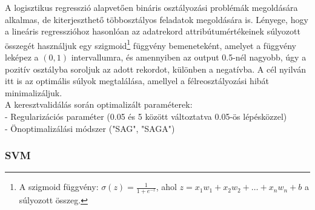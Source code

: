 \documentclass[12pt]{article}
\begin{document}
A logisztikus regresszió alapvetően bináris osztályozási problémák megoldására alkalmas, de kiterjeszthető többosztályos feladatok megoldására is. Lényege, hogy a lineáris regresszióhoz hasonlóan az adatrekord attribútumértékeinek súlyozott összegét használjuk egy szigmoid\footnote{A szigmoid függvény: $\sigma(z)=\frac{1}{1+e^{-z}}$, ahol $z=x_1w_1+x_2w_2+ \dots +x_nw_n+b$ a súlyozott összeg.} függvény bemeneteként, amelyet a függvény leképez a $\left(0,1\right)$ intervallumra, és amennyiben az output 0.5-nél nagyobb, úgy a pozitív osztályba soroljuk az adott rekordot, különben a negatívba. A cél nyilván itt is az optimális súlyok megtalálása, amellyel a félreosztályozási hibát minimalizáljuk. \\

\noindent A keresztvalidálás során optimalizált paraméterek: \\
- Regularizációs paraméter (0.05 és 5 között változtatva 0.05-ös lépésközzel) \\
- Önoptimalizálási módszer ("SAG", "SAGA") 

\subsubsection{SVM}

%
\end{document}
